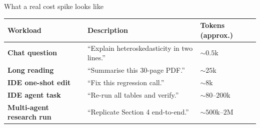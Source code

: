 \begin{frame}{What a real cost spike looks like}
  \vspace{0.2cm}
  \begin{center}
  \begin{tabularx}{0.94\linewidth}{>{\bfseries\color{deepblue}}lXl}
  \toprule
  Workload & Description & Tokens (approx.)\\
  \midrule
  Chat question & ``Explain heteroskedasticity in two lines.'' & $\sim 0.5$k\\
  Long reading & ``Summarise this 30-page PDF.'' & $\sim 25$k\\
  IDE one-shot edit & ``Fix this regression call.'' & $\sim 8$k\\
  IDE agent task & ``Re-run all tables and verify.'' & $\sim 80$--$200$k\\
  Multi-agent research run & ``Replicate Section 4 end-to-end.'' & $\sim 500$k--$2$M\\
  \bottomrule
  \end{tabularx}
  \end{center}
  \vspace{0.4cm}
  
\end{frame}

